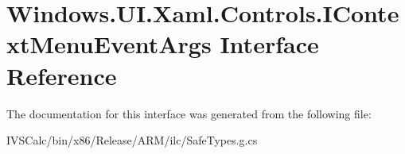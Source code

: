 \hypertarget{interface_windows_1_1_u_i_1_1_xaml_1_1_controls_1_1_i_context_menu_event_args}{}\section{Windows.\+U\+I.\+Xaml.\+Controls.\+I\+Context\+Menu\+Event\+Args Interface Reference}
\label{interface_windows_1_1_u_i_1_1_xaml_1_1_controls_1_1_i_context_menu_event_args}


The documentation for this interface was generated from the following file\+:\begin{DoxyCompactItemize}
\item 
I\+V\+S\+Calc/bin/x86/\+Release/\+A\+R\+M/ilc/Safe\+Types.\+g.\+cs\end{DoxyCompactItemize}
